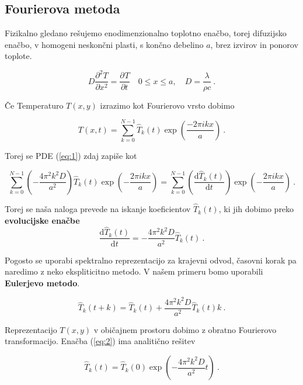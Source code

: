 \documentclass[a4paper]{article}
\newcommand{\ddd}{\mathrm{d}}
\newcommand{\Pd}[3][{}]{\frac{\partial^{#1} #2}{\partial #3^{#1}}}
\begin{document}
\subsection{Fourierova metoda}
Fizikalno gledano rešujemo enodimenzionalno toplotno enačbo, torej difuzijsko enačbo,
v homogeni neskončni plasti, s končno debelino $a$, brez izvirov in ponorov toplote.

\begin{equation}
    D\Pd[2]{T}{x} = \Pd{T}{t}\quad 0\leq x \leq a,\quad D=\frac{\lambda}{\rho c}\>.
    \label{eq:1}
\end{equation}

Če Temperaturo $T(x, y)$ izrazimo kot Fourierovo vrsto dobimo

\begin{equation}
    T(x, t) = \sum_{k=0}^{N-1}{\hat{T}_k(t)\exp{\left(\frac{-2\pi i k x}{a}\right)}}\>. 
\end{equation}

Torej se PDE (\ref{eq:1}) zdaj zapiše kot

\begin{equation}
    \sum_{k=0}^{N-1}{\left(-\frac{4\pi^2 k^2 D}{a^2}\right)\hat{T}_k(t)\exp{\left(-\frac{2\pi i k x}{a}\right)}} = 
    \sum_{k=0}^{N-1}{\left(\frac{\ddd \hat{T}_k(t)}{\ddd t}\right)\exp{\left(-\frac{2\pi i k x}{a}\right)}}\>.
\end{equation}

Torej se naša naloga prevede na iskanje koeficientov $\hat{T}_k(t)$, ki jih dobimo preko
\textbf{evolucijske enačbe}
\begin{equation}
    \frac{\ddd \hat{T}_k(t)}{\ddd t} = -\frac{4\pi^2 k^2 D}{a^2}\hat{T}_k(t)\>.
    \label{eq:2}
\end{equation}

Pogosto se uporabi spektralno reprezentacijo za krajevni odvod, časovni korak pa naredimo
z neko ekspliticitno metodo. V našem primeru bomo uporabili \textbf{Eulerjevo metodo}.

\begin{equation}
    \hat{T}_k(t+k) = \hat{T}_k(t) + \frac{4\pi^2 k^2 D}{a^2}\hat{T}_k(t)k\>.
    \label{eq:3}
\end{equation}

Reprezentacijo $T(x, y)$ v običajnem prostoru dobimo z obratno Fourierovo transformacijo. Enačba
(\ref{eq:2}) ima analitično rešitev

\begin{equation}
    \hat{T}_k(t) = \hat{T}_k(0)\exp{\left(-\frac{4\pi^2 k^2 D}{a^2}t\right)}\>.
    \label{eq:4}
\end{equation}
\end{document}
